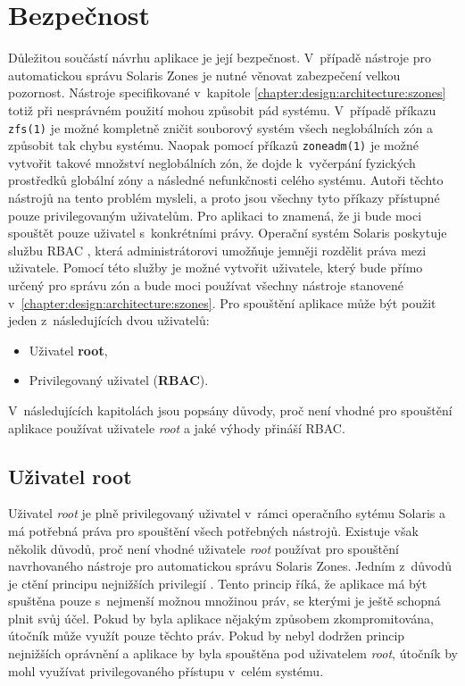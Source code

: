 \section{Bezpečnost}
\label{chapter:design:security}
Důležitou součástí návrhu aplikace je její bezpečnost. V~případě nástroje pro automatickou správu Solaris Zones je nutné věnovat
zabezpečení velkou pozornost. Nástroje specifikované v~kapitole \ref{chapter:design:architecture:szones} totiž při nesprávném
použití mohou způsobit pád systému. V~případě příkazu \verb|zfs(1)| je možné kompletně zničit souborový systém všech neglobálních zón
a způsobit tak chybu systému. Naopak pomocí příkazů \verb|zoneadm(1)| je možné vytvořit takové množství neglobálních zón, že
dojde k~vyčerpání fyzických prostředků globální zóny a následné nefunkčnosti celého systému. Autoři těchto nástrojů na tento
problém mysleli, a proto jsou všechny tyto příkazy přístupné pouze privilegovaným uživatelům. Pro aplikaci to znamená, že ji 
bude moci spouštět pouze uživatel s~konkrétními právy. Operační systém Solaris poskytuje službu RBAC \cite{oracle:solaris:desing:rbac},
která administrátorovi umožňuje jemněji rozdělit práva mezi uživatele. Pomocí této služby je možné vytvořit uživatele, který bude
přímo určený pro správu zón a bude moci používat všechny nástroje stanovené v~\ref{chapter:design:architecture:szones}. Pro spouštění
aplikace může být použit jeden z~následujících dvou uživatelů:
\begin{itemize}
 \item Uživatel \textbf{root},
 \item Privilegovaný uživatel (\textbf{RBAC}).
\end{itemize}
V~následujících kapitolách jsou popsány důvody, proč není vhodné pro spouštění aplikace používat uživatele \textit{root} a 
jaké výhody přináší RBAC.
\subsection{Uživatel root}
\label{chapter:design:security:root}
Uživatel \textit{root} je plně privilegovaný uživatel v~rámci operačního sytému Solaris a má potřebná práva pro spouštění všech
potřebných nástrojů. Existuje však několik důvodů, proč není vhodné uživatele \textit{root} používat pro spouštění navrhovaného
nástroje pro automatickou správu Solaris Zones. Jedním z~důvodů je ctění principu nejnižších privilegií 
\cite{cvut:presentations:least_user_privilege}. Tento princip říká, že aplikace má být spuštěna pouze s~nejmenší možnou množinou
práv, se kterými je ještě schopná plnit svůj účel. Pokud by byla aplikace nějakým způsobem zkompromitována, útočník může využít
pouze těchto práv. Pokud by nebyl dodržen princip nejnižších oprávnění a aplikace by byla spouštěna pod uživatelem \textit{root},
útočník by mohl využívat privilegovaného přístupu v~celém systému.

